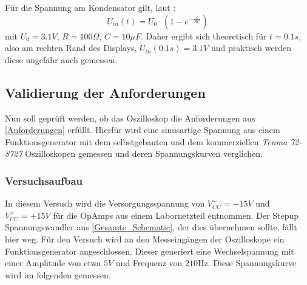 \newline
Für die Spannung am Kondensator gilt, laut \cite{Kondensator_Ladekurve}:
$$
U_{in}(t) = U_0 \cdot (1 - e^{- \frac{t}{RC}})
$$
mit $U_0 = 3.1V$, $R=100 \Omega$, $C = 10\mu F$.
Daher ergibt sich theoretisch für $t=0.1s$, also am rechten Rand des Displays, $U_{in}(0.1s) = 3.1V$
und praktisch werden diese ungefähr auch gemessen.


\subsection{Validierung der Anforderungen}
Nun soll geprüft werden, ob das Oszilloskop die Anforderungen aus \ref{Anforderungen} erfüllt.
Hierfür wird eine sinusartige Spannung aus einem Funktionsgenerator mit dem selbstgebauten
und dem kommerziellen \textit{Tenma 72-8727} Oszilloskopen gemessen
und deren Spannungskurven verglichen.


\subsubsection{Versuchsaufbau}
In diesem Versuch wird die Versorgungsspannung von $V^-_{CC} = -15V$ und $V^+_{CC} = +15V$
für die OpAmps aus einem Labornetzteil entnommen. Der Stepup Spannungswandler aus \ref{Gesamte_Schematic},
der dies übernehmen sollte, fällt hier weg. \newline
Für den Versuch wird an den Messeingängen der Oszilloskope ein Funktionsgenerator angeschlossen.
Dieser generiert eine Wechselspannung mit einer Amplitude von etwa $5V$ und Frequenz von $210\si{\hertz}$.
Diese Spannungskurve wird im folgenden gemessen.


